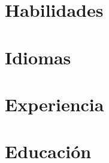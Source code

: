 \documentclass[10pt]{article}
\begin{document}


%

\section{Habilidades}


\section{Idiomas}


\section{Experiencia}


\section{Educación}





\end{document}

